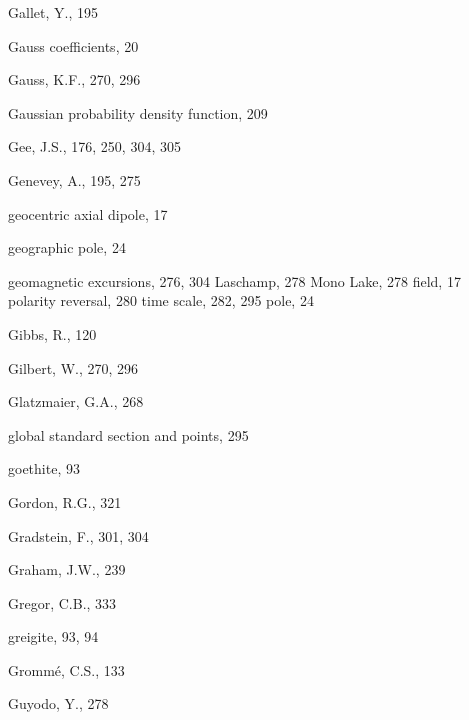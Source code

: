 \documentclass[,plain]{tauxe}
\begin{document}
\begin{theindex}
  \item Gallet, Y., 195
  \item Gauss coefficients, 20
  \item Gauss, K.F., 270, 296
  \item Gaussian probability density function, 209
  \item Gee, J.S., 176, 250, 304, 305
  \item Genevey, A., 195, 275
  \item geocentric axial dipole, 17
  \item geographic pole, 24
  \item geomagnetic
    \subitem excursions, 276, 304
      \subsubitem Laschamp, 278
      \subsubitem Mono Lake, 278
    \subitem field, 17
    \subitem polarity
      \subsubitem reversal, 280
      \subsubitem time scale, 282, 295
    \subitem pole, 24
  \item Gibbs, R., 120
  \item Gilbert, W., 270, 296
  \item Glatzmaier, G.A., 268
  \item global standard section and points, 295
  \item goethite, 93
  \item Gordon, R.G., 321
  \item Gradstein, F., 301, 304
  \item Graham, J.W., 239
  \item Gregor, C.B., 333
  \item greigite, 93, 94
  \item Gromm\'e, C.S., 133
  \item Guyodo, Y., 278

  \indexspace


\end{theindex}
\end{document}
